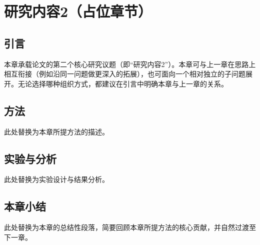 \clearpage

\section{研究内容2（占位章节）}

\subsection{引言}

本章承载论文的第二个核心研究议题（即“研究内容2”）。本章可与上一章在思路上相互衔接（例如沿同一问题做更深入的拓展），也可面向一个相对独立的子问题展开。无论选择哪种组织方式，都建议在引言中明确本章与上一章的关系。

\subsection{方法}

此处替换为本章所提方法的描述。

\subsection{实验与分析}

此处替换为实验设计与结果分析。

\subsection{本章小结}

此处替换为本章的总结性段落，简要回顾本章所提方法的核心贡献，并自然过渡至下一章。
